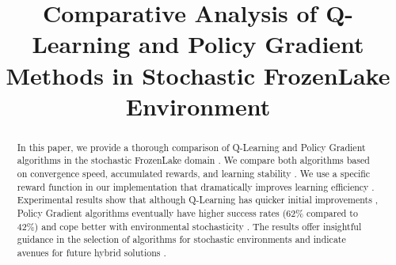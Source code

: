 \documentclass[conference]{IEEEtran}
\begin{document}
\title{Comparative Analysis of Q-Learning and Policy Gradient Methods in Stochastic FrozenLake Environment}

\author{
    \and
    \and
    \and
}

\maketitle

\begin{abstract}
In this paper, we provide a thorough comparison of Q-Learning and Policy Gradient algorithms in the stochastic FrozenLake domain \cite{Brockman2016}. We compare both algorithms based on convergence speed, accumulated rewards, and learning stability \cite{Henderson2018}. We use a specific reward function in our implementation that dramatically improves learning efficiency \cite{Ng1999}. Experimental results show that although Q-Learning has quicker initial improvements \cite{Watkins1992}, Policy Gradient algorithms eventually have higher success rates (62\% compared to 42\%) \cite{Schulman2015} and cope better with environmental stochasticity \cite{SuttonBarto2018}. The results offer insightful guidance in the selection of algorithms for stochastic environments and indicate avenues for future hybrid solutions \cite{Arulkumaran2017}.
\end{abstract}
\end{document}

